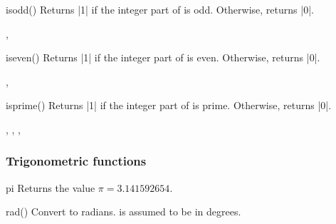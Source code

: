 \begin{math-function}{isodd()}
\mathcommand
    Returns |1| if the integer part of  is odd. Otherwise, returns |0|.
\begin{codeexample}[]
 \pgfmathresult,
 \pgfmathresult
\end{codeexample}
\end{math-function}

\begin{math-function}{iseven()}
\mathcommand
    Returns |1| if the integer part of  is even. Otherwise, returns |0|.
\begin{codeexample}[]
 \pgfmathresult,
 \pgfmathresult
\end{codeexample}
\end{math-function}

\begin{math-function}{isprime()}
\mathcommand
    Returns |1| if the integer part of  is prime. Otherwise, returns |0|.
\begin{codeexample}[]
 \pgfmathresult,
 \pgfmathresult,
 \pgfmathresult,
 \pgfmathresult
\end{codeexample}
\end{math-function}


\subsubsection{Trigonometric functions}
\label{pgfmath-functions-trigonometric}

\begin{math-function}{pi}
\mathcommand
    Returns the value $\pi=3.141592654$.
\begin{codeexample}[]
 \pgfmathresult
\end{codeexample}

\begin{codeexample}[]
 \pgfmathresult
\end{codeexample}
\end{math-function}

\begin{math-function}{rad()}
\mathcommand
    Convert  to radians.  is assumed to be in degrees.
\begin{codeexample}[]
 \pgfmathresult
\end{codeexample}
\end{math-function}

